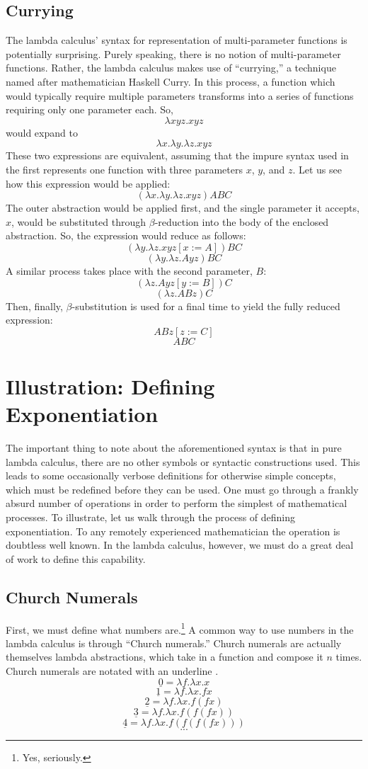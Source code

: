 \documentclass[twocolumn,titlepage,12pt]{article}
\begin{document}
\subsection{Currying}
The lambda calculus' syntax for representation of multi-parameter functions is potentially surprising. Purely speaking, there is no notion of multi-parameter functions. Rather, the lambda calculus makes use of ``currying,'' a technique named after mathematician Haskell Curry. In this process, a function which would typically require multiple parameters transforms into a series of functions requiring only one parameter each. So,
$$\lambda xyz.xyz$$
would expand to
$$\lambda x.\lambda y.\lambda z.xyz$$
These two expressions are equivalent, assuming that the impure syntax used in the first represents one function with three parameters $x$, $y$, and $z$. Let us see how this expression would be applied:
$$(\lambda x.\lambda y.\lambda z.xyz)ABC$$
The outer abstraction would be applied first, and the single parameter it accepts, $x$, would be substituted through $\beta$-reduction into the body of the enclosed abstraction. So, the expression would reduce as follows:
$$(\lambda y.\lambda z.xyz[x:=A])BC$$
$$(\lambda y.\lambda z.Ayz)BC$$
A similar process takes place with the second parameter, $B$:
$$(\lambda z.Ayz[y:=B])C$$
$$(\lambda z.ABz)C$$
Then, finally, $\beta$-substitution is used for a final time to yield the fully reduced expression:
$$ABz[z:=C]$$
$$ABC$$

\section{Illustration: Defining Exponentiation}
The important thing to note about the aforementioned syntax is that in pure lambda calculus, there are no other symbols or syntactic constructions used. This leads to some occasionally verbose definitions for otherwise simple concepts, which must be redefined before they can be used. One must go through a frankly absurd number of operations in order to perform the simplest of mathematical processes. To illustrate, let us walk through the process of defining exponentiation. To any remotely experienced mathematician the operation is doubtless well known. In the lambda calculus, however, we must do a great deal of work to define this capability.

\subsection{Church Numerals}
First, we must define what numbers are.\footnote{Yes, seriously.} A common way to use numbers in the lambda calculus is through ``Church numerals.'' Church numerals are actually themselves lambda abstractions, which take in a function and compose it $n$ times. Church numerals are notated with an underline \cite{cornelllc}.
$$\underline{0}=\lambda f.\lambda x.x$$
$$\underline{1}=\lambda f.\lambda x.fx$$
$$\underline{2}=\lambda f.\lambda x.f(fx)$$
$$\underline{3}=\lambda f.\lambda x.f(f(fx))$$
$$\underline{4}=\lambda f.\lambda x.f(f(f(fx)))$$
$$...$$
\end{document}
